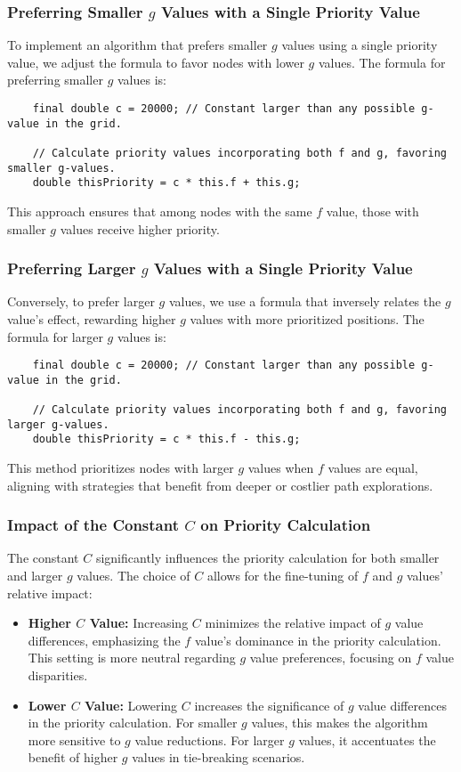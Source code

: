 \documentclass{article}
\begin{document}
\subsubsection{Preferring Smaller \(g\) Values with a Single Priority Value}
To implement an algorithm that prefers smaller \(g\) values using a single priority value, we adjust the formula to favor nodes with lower \(g\) values. The formula for preferring smaller \(g\) values is:
\begin{verbatim}
    final double c = 20000; // Constant larger than any possible g-value in the grid.
    
    // Calculate priority values incorporating both f and g, favoring smaller g-values.
    double thisPriority = c * this.f + this.g;
\end{verbatim}
This approach ensures that among nodes with the same \(f\) value, those with smaller \(g\) values receive higher priority.

\subsubsection{Preferring Larger \(g\) Values with a Single Priority Value}
Conversely, to prefer larger \(g\) values, we use a formula that inversely relates the \(g\) value's effect, rewarding higher \(g\) values with more prioritized positions. The formula for larger \(g\) values is:
\begin{verbatim}
    final double c = 20000; // Constant larger than any possible g-value in the grid.
    
    // Calculate priority values incorporating both f and g, favoring larger g-values.
    double thisPriority = c * this.f - this.g;
\end{verbatim}
This method prioritizes nodes with larger \(g\) values when \(f\) values are equal, aligning with strategies that benefit from deeper or costlier path explorations.

\subsubsection{Impact of the Constant \(C\) on Priority Calculation}
The constant \(C\) significantly influences the priority calculation for both smaller and larger \(g\) values. The choice of \(C\) allows for the fine-tuning of \(f\) and \(g\) values' relative impact:
\begin{itemize}
    \item \textbf{Higher \(C\) Value:} Increasing \(C\) minimizes the relative impact of \(g\) value differences, emphasizing the \(f\) value's dominance in the priority calculation. This setting is more neutral regarding \(g\) value preferences, focusing on \(f\) value disparities.
    \item \textbf{Lower \(C\) Value:} Lowering \(C\) increases the significance of \(g\) value differences in the priority calculation. For smaller \(g\) values, this makes the algorithm more sensitive to \(g\) value reductions. For larger \(g\) values, it accentuates the benefit of higher \(g\) values in tie-breaking scenarios.
\end{itemize}
\end{document}
